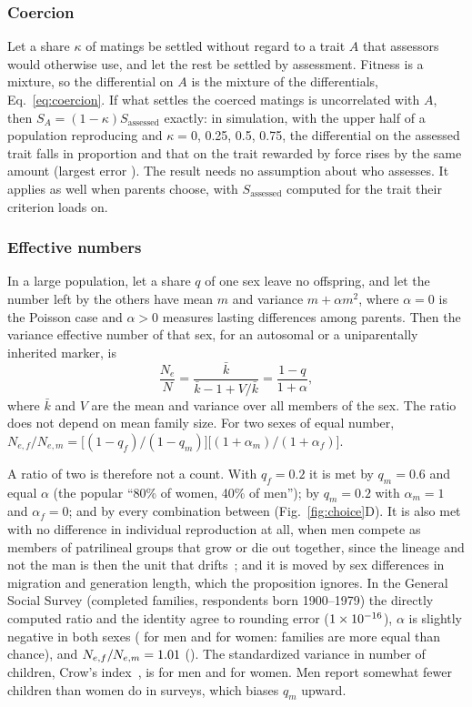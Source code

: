 \subsubsection{Coercion} Let a share $\kappa$ of matings be settled without regard to a trait $A$ that assessors would
otherwise use, and let the rest be settled by assessment. Fitness is a mixture, so the differential on $A$ is the mixture
of the differentials, Eq.~\eqref{eq:coercion}. If what settles the coerced matings is uncorrelated with $A$, then
$S_A=(1-\kappa)S_{\text{assessed}}$ exactly: in simulation, with the upper half of a population reproducing and
$\kappa=0$, 0.25, 0.5, 0.75, the differential on the assessed trait falls in proportion and that on the trait rewarded by
force rises by the same amount (largest error \NtCoeErr). The result needs no assumption about who assesses. It applies as
well when parents choose, with $S_{\text{assessed}}$ computed for the trait their criterion loads on.

\subsubsection{Effective numbers}
\begin{proposition}\label{prop:ancestors}
In a large population, let a share $q$ of one sex leave no offspring, and let the number left by the others have mean $m$
and variance $m+\alpha m^2$, where $\alpha=0$ is the Poisson case and $\alpha>0$ measures lasting differences among
parents. Then the variance effective number of that sex, for an autosomal or a uniparentally inherited marker, is
\begin{equation*}
\frac{N_e}{N}=\frac{\bar k}{\bar k-1+V/\bar k}=\frac{1-q}{1+\alpha},
\end{equation*}
where $\bar k$ and $V$ are the mean and variance over all members of the sex. The ratio does not depend on mean family
size. For two sexes of equal number,
$N_{e,f}/N_{e,m}=\big[(1-q_f)/(1-q_m)\big]\big[(1+\alpha_m)/(1+\alpha_f)\big]$.
\end{proposition}

A ratio of two is therefore not a count. With $q_f=0.2$ it is met by $q_m=0.6$ and equal $\alpha$ (the popular ``80\% of
women, 40\% of men''); by $q_m=0.2$ with $\alpha_m=1$ and $\alpha_f=0$; and by every combination between
(Fig.~\ref{fig:choice}D). It is also met with no difference in individual reproduction at all, when men compete as members
of patrilineal groups that grow or die out together, since the lineage and not the man is then the unit that
drifts~\cite{zeng2018}; and it is moved by sex differences in migration and generation length, which the proposition
ignores. In the General Social Survey (completed families, \VgAncN{} respondents born 1900--1979) the directly computed
ratio and the identity agree to rounding error ($1\times10^{-16}$), $\alpha$ is slightly negative in both sexes (\VgAlphaM{} for men
and \VgAlphaW{} for women: families are more equal than chance), and $N_{e,f}/N_{e,m}=1.01$ (\VgNeRatioCI). The
standardized variance in number of children, Crow's index~\cite{crow1958}, is \VgIm{} for men and \VgIf{} for women. Men report somewhat
fewer children than women do in surveys, which biases $q_m$ upward.

